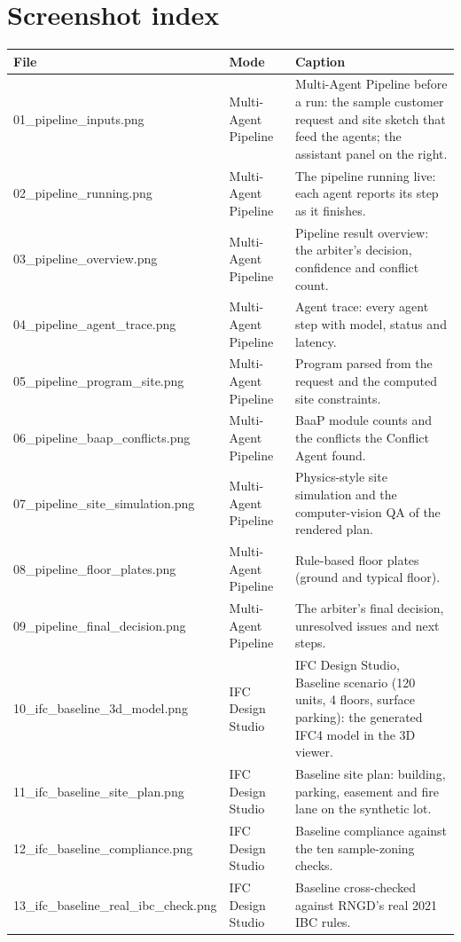 \documentclass[10pt]{article}
\begin{document}
\section{Screenshot index}
{\small \begin{longtable}{p{4.4cm}p{2.8cm}p{8.8cm}}
\toprule
\textbf{File} & \textbf{Mode} & \textbf{Caption} \\ \midrule \endhead
01\_pipeline\_inputs.png & Multi-Agent Pipeline & Multi-Agent Pipeline before a run: the sample customer request and site sketch that feed the agents; the assistant panel on the right. \\
02\_pipeline\_running.png & Multi-Agent Pipeline & The pipeline running live: each agent reports its step as it finishes. \\
03\_pipeline\_overview.png & Multi-Agent Pipeline & Pipeline result overview: the arbiter's decision, confidence and conflict count. \\
04\_pipeline\_agent\_trace.png & Multi-Agent Pipeline & Agent trace: every agent step with model, status and latency. \\
05\_pipeline\_program\_site.png & Multi-Agent Pipeline & Program parsed from the request and the computed site constraints. \\
06\_pipeline\_baap\_conflicts.png & Multi-Agent Pipeline & BaaP module counts and the conflicts the Conflict Agent found. \\
07\_pipeline\_site\_simulation.png & Multi-Agent Pipeline & Physics-style site simulation and the computer-vision QA of the rendered plan. \\
08\_pipeline\_floor\_plates.png & Multi-Agent Pipeline & Rule-based floor plates (ground and typical floor). \\
09\_pipeline\_final\_decision.png & Multi-Agent Pipeline & The arbiter's final decision, unresolved issues and next steps. \\
10\_ifc\_baseline\_3d\_model.png & IFC Design Studio & IFC Design Studio, Baseline scenario (120 units, 4 floors, surface parking): the generated IFC4 model in the 3D viewer. \\
11\_ifc\_baseline\_site\_plan.png & IFC Design Studio & Baseline site plan: building, parking, easement and fire lane on the synthetic lot. \\
12\_ifc\_baseline\_compliance.png & IFC Design Studio & Baseline compliance against the ten sample-zoning checks. \\
13\_ifc\_baseline\_real\_ibc\_check.png & IFC Design Studio & Baseline cross-checked against RNGD's real 2021 IBC rules. \\

\end{longtable}}
\end{document}
